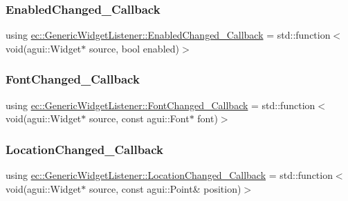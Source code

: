 \subsubsection{\texorpdfstring{Enabled\+Changed\+\_\+\+Callback}{EnabledChanged\_Callback}}
{\footnotesize\ttfamily using \mbox{\hyperlink{classec_1_1_generic_widget_listener_aa45e97274cfc832de2b027f94aeaa4c5}{ec\+::\+Generic\+Widget\+Listener\+::\+Enabled\+Changed\+\_\+\+Callback}} =  std\+::function$<$void(agui\+::\+Widget$\ast$ source, bool enabled)$>$}

\mbox{\label{classec_1_1_generic_widget_listener_a996d1f52cd8a7b2b68b65956df295fe4}} 
\subsubsection{\texorpdfstring{Font\+Changed\+\_\+\+Callback}{FontChanged\_Callback}}
{\footnotesize\ttfamily using \mbox{\hyperlink{classec_1_1_generic_widget_listener_a996d1f52cd8a7b2b68b65956df295fe4}{ec\+::\+Generic\+Widget\+Listener\+::\+Font\+Changed\+\_\+\+Callback}} =  std\+::function$<$void(agui\+::\+Widget$\ast$ source, const agui\+::\+Font$\ast$ font)$>$}

\mbox{\label{classec_1_1_generic_widget_listener_ace866e0f10178009a4cdb4868f183316}} 
\subsubsection{\texorpdfstring{Location\+Changed\+\_\+\+Callback}{LocationChanged\_Callback}}
{\footnotesize\ttfamily using \mbox{\hyperlink{classec_1_1_generic_widget_listener_ace866e0f10178009a4cdb4868f183316}{ec\+::\+Generic\+Widget\+Listener\+::\+Location\+Changed\+\_\+\+Callback}} =  std\+::function$<$void(agui\+::\+Widget$\ast$ source, const agui\+::\+Point\& position)$>$}

